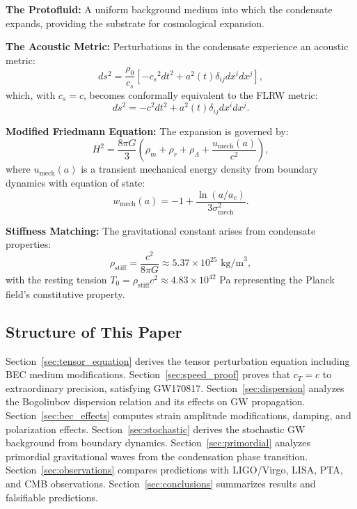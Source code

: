 \documentclass[11pt,a4paper]{article}
\newcommand{\rhostiff}{\ensuremath{\rho_{\mathrm{stiff}}}}
\newcommand{\Tzero}{\ensuremath{T_0}}
\newcommand{\cs}{\ensuremath{c_s}}
\newcommand{\cT}{\ensuremath{c_T}}
\newcommand{\umech}{\ensuremath{u_{\mathrm{mech}}}}
\newcommand{\wmech}{\ensuremath{w_{\mathrm{mech}}}}
\theoremstyle{definition}
\theoremstyle{remark}
\begin{document}
\textbf{The Protofluid:} A uniform background medium into which the condensate expands, providing the substrate for cosmological expansion.

\textbf{The Acoustic Metric:} Perturbations in the condensate experience an acoustic metric:
\begin{equation}
\label{eq:acoustic_metric}
ds^2 = \frac{\rho_0}{\cs}\left[-\cs^2 dt^2 + a^2(t)\delta_{ij}dx^i dx^j\right],
\end{equation}
which, with $\cs = c$, becomes conformally equivalent to the FLRW metric:
\begin{equation}
\label{eq:flrw_metric}
ds^2 = -c^2 dt^2 + a^2(t)\delta_{ij}dx^i dx^j.
\end{equation}

\textbf{Modified Friedmann Equation:} The expansion is governed by:
\begin{equation}
\label{eq:friedmann_modified}
H^2 = \frac{8\pi G}{3}\left(\rho_m + \rho_r + \rho_\Lambda + \frac{\umech(a)}{c^2}\right),
\end{equation}
where $\umech(a)$ is a transient mechanical energy density from boundary dynamics with equation of state:
\begin{equation}
\label{eq:wmech}
\wmech(a) = -1 + \frac{\ln(a/a_c)}{3\sigma_{\mathrm{mech}}^2}.
\end{equation}

\textbf{Stiffness Matching:} The gravitational constant arises from condensate properties:
\begin{equation}
\label{eq:stiffness_matching}
\rhostiff = \frac{c^2}{8\pi G} \approx 5.37 \times 10^{25} \text{ kg/m}^3,
\end{equation}
with the resting tension $\Tzero = \rhostiff c^2 \approx 4.83 \times 10^{42}$ Pa representing the Planck field's constitutive property.

\subsection{Structure of This Paper}
\label{sec:structure}

Section~\ref{sec:tensor_equation} derives the tensor perturbation equation including BEC medium modifications. Section~\ref{sec:speed_proof} proves that $\cT = c$ to extraordinary precision, satisfying GW170817. Section~\ref{sec:dispersion} analyzes the Bogoliubov dispersion relation and its effects on GW propagation. Section~\ref{sec:bec_effects} computes strain amplitude modifications, damping, and polarization effects. Section~\ref{sec:stochastic} derives the stochastic GW background from boundary dynamics. Section~\ref{sec:primordial} analyzes primordial gravitational waves from the condensation phase transition. Section~\ref{sec:observations} compares predictions with LIGO/Virgo, LISA, PTA, and CMB observations. Section~\ref{sec:conclusions} summarizes results and falsifiable predictions.
\end{document}
